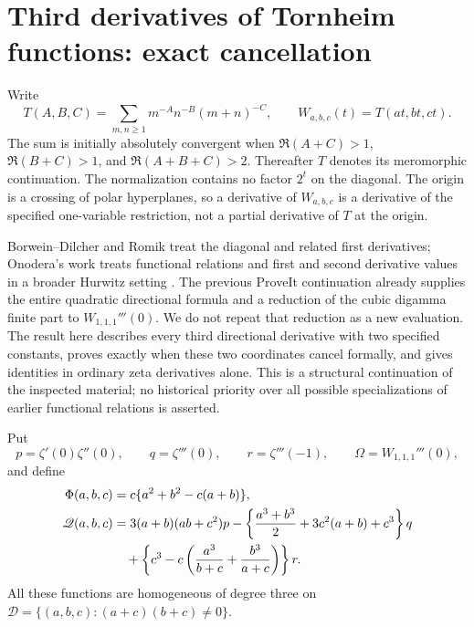 \section{Third derivatives of Tornheim functions: exact cancellation}
\label{tc:sec}

Write
\[
 T(A,B,C)=\sum_{m,n\ge1}m^{-A}n^{-B}(m+n)^{-C},
 \qquad W_{a,b,c}(t)=T(at,bt,ct).
\]
The sum is initially absolutely convergent when
$\Re(A+C)>1$, $\Re(B+C)>1$, and $\Re(A+B+C)>2$.
Thereafter $T$ denotes its meromorphic continuation.  The normalization
contains no factor $2^t$ on the diagonal.  The origin is a crossing of
polar hyperplanes, so a derivative of $W_{a,b,c}$ is a derivative of
the specified one-variable restriction, not a partial derivative of
$T$ at the origin.

Borwein--Dilcher and Romik treat the diagonal and related first
derivatives; Onodera's work treats functional relations and first and
second derivative values in a broader Hurwitz setting
\cite{TC:BD,TC:Romik,TC:Onodera2014,TC:Onodera2021}.
The previous ProveIt continuation already supplies the entire
quadratic directional formula and a reduction of the cubic digamma
finite part to $W_{1,1,1}'''(0)$.  We do not repeat that reduction as a
new evaluation.  The result here describes every third directional
derivative with two specified constants, proves exactly when these
two coordinates cancel formally, and gives identities in ordinary
zeta derivatives alone.  This is a structural continuation of the
inspected material; no historical priority over all possible
specializations of earlier functional relations is asserted.

Put
\[
 p=\zeta'(0)\zeta''(0),\qquad q=\zeta'''(0),\qquad
 r=\zeta'''(-1),\qquad \Omega=W_{1,1,1}'''(0),
\]
and define
\begin{align}
 \Phi(a,b,c)&=c\{a^2+b^2-c(a+b)\},\label{tc:Phi}\\
 \mathscr Q(a,b,c)
 &=3(a+b)(ab+c^2)p
   -\left\{\frac{a^3+b^3}{2}+3c^2(a+b)+c^3\right\}q\notag\\
 &\quad+\left\{c^3-c\left(\frac{a^3}{b+c}
                              +\frac{b^3}{a+c}\right)\right\}r.
 \label{tc:Q}
\end{align}
All these functions are homogeneous of degree three on
$\mathscr D=\{(a,b,c):(a+c)(b+c)\ne0\}$.


